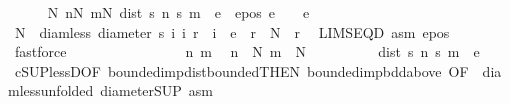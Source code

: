 \begin{isabellebody}
\ \ \ \ \isamarkupfalse%
\ {\isachardoublequoteopen}{\isasymexists}N{\isachardot}{\kern0pt}\ {\isasymforall}n{\isasymge}N{\isachardot}{\kern0pt}\ {\isasymforall}m{\isasymge}N{\isachardot}{\kern0pt}\ dist\ {\isacharparenleft}{\kern0pt}s\ n{\isacharparenright}{\kern0pt}\ {\isacharparenleft}{\kern0pt}s\ m{\isacharparenright}{\kern0pt}\ {\isacharless}{\kern0pt}\ e{\isachardoublequoteclose}\ \ e{\isacharunderscore}{\kern0pt}pos{\isacharcolon}{\kern0pt}\ {\isachardoublequoteopen}e\ {\isachargreater}{\kern0pt}\ {}{\isachardoublequoteclose}\ \ e\isanewline
\ \ \ \ \isamarkupfalse%
\ {\isacharminus}{\kern0pt}\isanewline
\ \ \ \ \ \ \isamarkupfalse%
\ N\ \ diam{\isacharunderscore}{\kern0pt}less{\isacharcolon}{\kern0pt}\ {\isachardoublequoteopen}diameter\ {\isacharbraceleft}{\kern0pt}s\ i\ {\isacharbar}{\kern0pt}i{\isachardot}{\kern0pt}\ r\ {\isasymle}\ i{\isacharbraceright}{\kern0pt}\ {\isacharless}{\kern0pt}\ e{\isachardoublequoteclose}\ \ {\isachardoublequoteopen}r\ {\isasymge}\ N{\isachardoublequoteclose}\ \ r\ \isamarkupfalse%
\ LIMSEQ{\isacharunderscore}{\kern0pt}D\ asm{\isacharparenleft}{\kern0pt}{}{\isacharparenright}{\kern0pt}\ e{\isacharunderscore}{\kern0pt}pos\ \isamarkupfalse%
\ fastforce\isanewline
\ \ \ \ \ \ \isacommand{{\isacharbraceleft}{\kern0pt}}\isamarkupfalse%
\isanewline
\ \ \ \ \ \ \ \ \isamarkupfalse%
\ n\ m\ \isamarkupfalse%
\ {\isachardoublequoteopen}n\ {\isasymge}\ N{\isachardoublequoteclose}\ {\isachardoublequoteopen}m\ {\isasymge}\ N{\isachardoublequoteclose}\isanewline
\ \ \ \ \ \ \ \ \isamarkupfalse%
\ {\isachardoublequoteopen}dist\ {\isacharparenleft}{\kern0pt}s\ n{\isacharparenright}{\kern0pt}\ {\isacharparenleft}{\kern0pt}s\ m{\isacharparenright}{\kern0pt}\ {\isacharless}{\kern0pt}\ e{\isachardoublequoteclose}\ \isamarkupfalse%
\ cSUP{\isacharunderscore}{\kern0pt}lessD{\isacharbrackleft}{\kern0pt}OF\ bounded{\isacharunderscore}{\kern0pt}imp{\isacharunderscore}{\kern0pt}dist{\isacharunderscore}{\kern0pt}bounded{\isacharbrackleft}{\kern0pt}THEN\ bounded{\isacharunderscore}{\kern0pt}imp{\isacharunderscore}{\kern0pt}bdd{\isacharunderscore}{\kern0pt}above{\isacharbrackright}{\kern0pt}{\isacharcomma}{\kern0pt}\ OF\ {\isacharunderscore}{\kern0pt}\ diam{\isacharunderscore}{\kern0pt}less{\isacharbrackleft}{\kern0pt}unfolded\ diameter{\isacharunderscore}{\kern0pt}SUP{\isacharbrackright}{\kern0pt}{\isacharbrackright}{\kern0pt}\ asm\ \isamarkupfalse%

\end{isabellebody}
